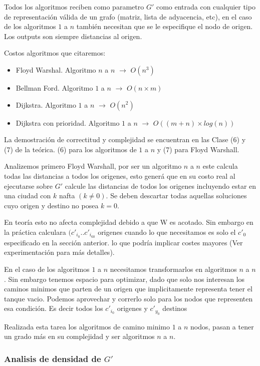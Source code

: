 \documentclass[12pt]{article}
\begin{document}
Todos los algoritmos reciben como parametro $G'$ como entrada con cualquier tipo de representación válida de un grafo (matriz, lista de adyacencia, etc), en el caso de los algoritmos $1$ a $n$ también necesitan que se le especifique el nodo de origen. Los outputs son siempre distancias al origen.

Costos algoritmos que citaremos:
\begin{itemize}
	\item Floyd Warshal. Algoritmo $n$ a $n$ $\rightarrow$  $O(n^3)$
	\item Bellman Ford. Algoritmo $1$ a $n$ $\rightarrow$ $O(n \times m)$
	\item Dijkstra. Algoritmo $1$ a $n$ $\rightarrow$ $O(n^2)$
	\item Dijkstra con prioridad. Algoritmo $1$ a $n$ $\rightarrow$  $O((m + n) \times log (n))$
\end{itemize}

La demostración de correctitud y complejidad se encuentran en las Clase (6) y (7) de la teórica. (6) para los algoritmos de $1$ a $n$ y (7) para Floyd Warshall.

Analizemos primero Floyd Warshall, por ser un algoritmo $n$ a $n$ este calcula todas las distancias a todos los origenes, esto generá que en su costo real al ejecutarse sobre $G'$ calcule las distancias de todos los origenes incluyendo estar en una ciudad con $k$ nafta $(k \neq 0)$. Se deben descartar todas aquellas soluciones cuyo origen y destino no posea $k = 0$. 

En teoría esto no afecta complejidad debido a que W es acotado. Sin embargo en la práctica calculara $(c'_{i_0}..c'_{i_{60}}$ origenes cuando lo que necesitamos es solo el $c'_0$ especificado en la sección anterior. lo que podría implicar costes mayores (Ver experimentación para más detalles).

En el caso de los algoritmos $1$ a $n$ necesitamos transformarlos en algoritmos $n$ a $n$. Sin embargo tenemos espacio para optimizar, dado que solo nos interesan los caminos minimos que parten de un origen que implicitamente representa tener el tanque vacio. Podemos aprovechar y correrlo solo para los nodos que representen esa condición. Es decir todos los $c'_{i_0}$ origenes y $c'_{y_0}$ destinos

Realizada esta tarea los algoritmos de camino minimo $1$ a $n$ nodos, pasan a tener un grado más en su complejidad y ser algoritmos $n$ a $n$.

\subsubsection{Analisis de densidad de $G'$}
\end{document}
